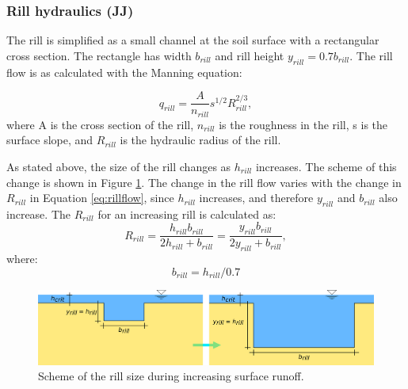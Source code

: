         \subsubsection{Rill hydraulics (JJ)}\label{sec:rill}

            The rill is simplified as a small channel at the soil surface with
            a rectangular cross section. The rectangle has width $b_{rill}$ and
            rill height $y_{rill} = 0.7b_{rill}$. The rill flow is as
            calculated with the Manning equation: 

            \begin{equation}
                q_{rill} = \frac{A}{n_{rill}} s^{1/2} R_{rill}^{2/3},
              \label{eq:rillflow}
            \end{equation}
            where A is the cross section of the rill,  $n_{rill}$ is the roughness in the
            rill, s is the surface slope, and  $R_{rill}$  is the hydraulic radius of the
            rill. 

            As stated above, the size of the rill changes as $h_{rill}$ increases. The
            scheme of this change is shown in Figure \ref{fig:rill_plneni}. The change in
            the rill flow varies with the change in $R_{rill}$ in Equation
            \ref{eq:rillflow}, since $h_{rill}$ increases, and therefore $y_{rill}$ and
            $b_{rill}$ also increase. The $R_{rill}$ for an increasing rill is calculated
            as:
            \begin{equation}
                R_{rill} = \frac{h_{rill}b_{rill}}{2h_{rill}+b_{rill}}  =
                \frac{y_{rill}b_{rill}}{2y_{rill}+b_{rill}},
              \label{eq:rrill}
            \end{equation}
            where:
            \begin{equation}
              b_{rill} = h_{rill}/0.7
              \label{eq:brill}
            \end{equation}


            \begin{figure}[b]
                \centering
                \includegraphics[width=1\linewidth]{./img/rill_schema_plneni.png}
                \caption{Scheme of the rill size during increasing surface runoff.}
                \label{fig:rill_plneni}
            \end{figure}


